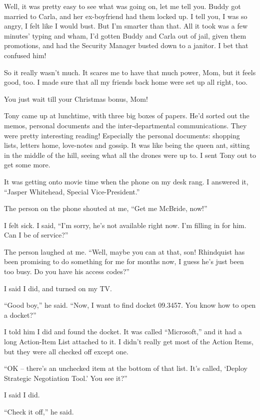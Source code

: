 Well, it was pretty easy to see what was going on, let me tell you. 
Buddy got married to Carla, and her ex-boyfriend had them locked up. I 
tell you, I was so angry, I felt like I would bust. But I'm smarter 
than that. All it took was a few minutes' typing and wham, I'd gotten 
Buddy and Carla out of jail, given them promotions, and had the 
Security Manager busted down to a janitor. I bet that confused him!

So it really wasn't much. It scares me to have that much power, Mom, 
but it feels good, too. I made sure that all my friends back home were 
set up all right, too.

You just wait till your Christmas bonus, Mom!

Tony came up at lunchtime, with three big boxes of papers. He'd sorted 
out the memos, personal documents and the inter-departmental 
communications. They were pretty interesting reading! Especially the 
personal documents: shopping lists, letters home, love-notes and 
gossip. It was like being the queen ant, sitting in the middle of the 
hill, seeing what all the drones were up to. I sent Tony out to get 
some more.

It was getting onto movie time when the phone on my desk rang. I 
answered it, “Jasper Whitehead, Special Vice-President.”

The person on the phone shouted at me, “Get me McBride, now!”

I felt sick. I said, “I'm sorry, he's not available right now. I'm 
filling in for him. Can I be of service?”

The person laughed at me. “Well, maybe you can at that, son! 
Rhindquist has been promising to do something for me for months now, I 
guess he's just been too busy. Do you have his access codes?”

I said I did, and turned on my TV.

“Good boy,” he said. “Now, I want to find docket 09.3457. You 
know how to open a docket?”

I told him I did and found the docket. It was called “Microsoft,” 
and it had a long Action-Item List attached to it. I didn't really get 
most of the Action Items, but they were all checked off except one.

“OK -- there's an unchecked item at the bottom of that list. It's 
called, `Deploy Strategic Negotiation Tool.' You see it?”

I said I did.

“Check it off,” he said.

